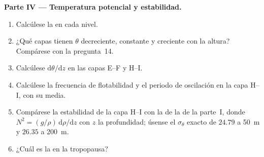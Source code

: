 \begin{problem}
\medskip
\noindent\textbf{Parte IV --- Temperatura potencial y estabilidad.}
\begin{enumerate}[resume]
  \item Calcúlese la  en cada nivel.
  \item ¿Qué capas tienen $\theta$ decreciente, constante y creciente con la altura? Compárese con la pregunta~14.
  \item Calcúlese $\mathrm d\theta/\mathrm dz$ en las capas E--F y H--I.
  \item Calcúlese la frecuencia de flotabilidad y el periodo de oscilación en la capa H--I, con su  media.
  \item Compárese la estabilidad de la capa H--I con la de la  de la parte~I, donde $N^2 = (g/\rho)\,\mathrm d\rho/\mathrm dz$ con $z$ la profundidad; úsense el $\sigma_\theta$ exacto de $24.79$ a \qty{50}{m} y $26.35$ a
        \qty{200}{m}.
  \item ¿Cuál es la  en la tropopausa?
\end{enumerate}
\end{problem}
